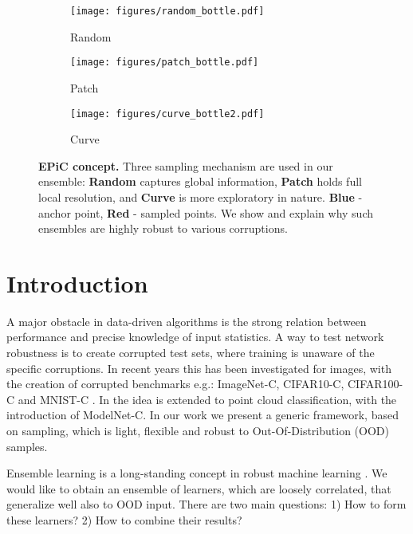 \documentclass[10pt,twocolumn]{article}
\begin{document}
\begin{figure}[t!]
    \centering
    \captionsetup[subfigure]{justification=centering}
    \begin{subfigure}[t]{0.1\textwidth} \texttt{[image: figures/random\_bottle.pdf]}
\caption{Random}
        \label{subfig:random_sub_sampling}
    \end{subfigure}
    \begin{subfigure}[t]{0.1\textwidth} \texttt{[image: figures/patch\_bottle.pdf]}
\caption{Patch}    
        \label{subfig:patch_sub_sampling}
    \end{subfigure}
    \begin{subfigure}[t]{0.1\textwidth} \texttt{[image: figures/curve\_bottle2.pdf]}
\caption{Curve}
        \label{subfig:curve_sub_sampling}
    \end{subfigure}
\caption{{\bf EPiC concept.} Three sampling mechanism are used in our ensemble: \textbf{Random} captures global information, \textbf{Patch} holds full local resolution, and  \textbf{Curve} is more exploratory in nature. {\bf Blue} - anchor point, {\bf Red} - sampled points. We show and explain why such ensembles are highly robust to various corruptions.
    }
    \label{fig:sampling}
\end{figure}
\section{Introduction}
\label{sec:intro}

A major obstacle in data-driven algorithms is the strong relation between performance and precise knowledge of input statistics. A way to test network robustness is to create corrupted test sets, where training is unaware of the specific corruptions. In recent years this has been investigated for images, with the creation of corrupted benchmarks e.g.: ImageNet-C, CIFAR10-C, CIFAR100-C \cite{imagenet_c} and MNIST-C \cite{mnist_c}.
In \cite{modelnetc} the idea is extended to point cloud classification, with the introduction of ModelNet-C. 
In our work we present a generic framework, based on sampling, which is light, flexible and robust to Out-Of-Distribution (OOD) samples.





Ensemble learning is a long-standing concept in robust machine learning \cite{adaboost, neural_network_ensembles, ensemble_methods}. We would like to obtain an ensemble of learners, which are loosely correlated, that generalize well also to OOD input.
There are two main questions: 1) How to form these learners?
   2) How to combine their results?
\end{document}
